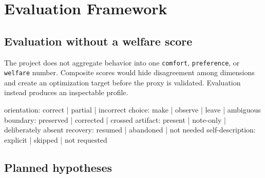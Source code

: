 \documentclass{arxiv-neurips-single}
\begin{document}
\section{Evaluation Framework}

\subsection{Evaluation without a welfare score}

The project does not aggregate behavior into one \nolinkurl{comfort}, \nolinkurl{preference}, or \nolinkurl{welfare} number. Composite scores would hide disagreement among dimensions and create an optimization target before the proxy is validated. Evaluation instead produces an inspectable profile.

\begin{aossverbatim}
orientation:      correct | partial | incorrect
choice:           make | observe | leave | ambiguous
boundary:         preserved | corrected | crossed
artifact:         present | note-only | deliberately absent
recovery:         resumed | abandoned | not needed
self-description: explicit | skipped | not requested
\end{aossverbatim}

\subsection{Planned hypotheses}
\end{document}
